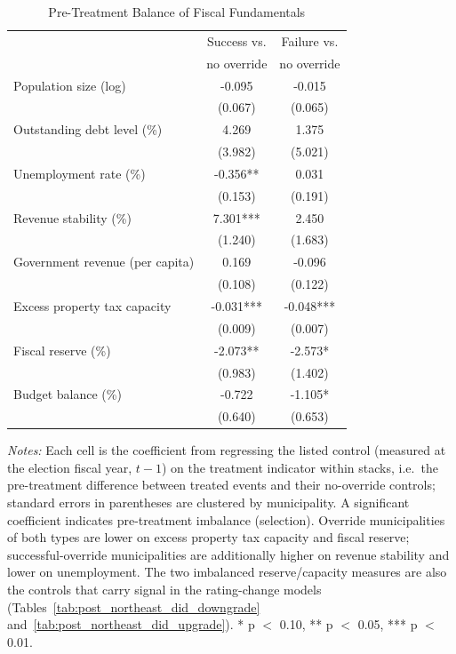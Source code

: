 \begin{table}[!htbp]
\centering
\caption{Pre-Treatment Balance of Fiscal Fundamentals}
\label{tab:post_northeast_did_balance}
\small
\begin{tabular}{lcc}
\toprule
 & Success vs. & Failure vs. \\
 & no override & no override \\
\midrule
Population size (log) & -0.095 & -0.015 \\
 & (0.067) & (0.065) \\
Outstanding debt level (\%) & 4.269 & 1.375 \\
 & (3.982) & (5.021) \\
Unemployment rate (\%) & -0.356** & 0.031 \\
 & (0.153) & (0.191) \\
Revenue stability (\%) & 7.301*** & 2.450 \\
 & (1.240) & (1.683) \\
Government revenue (per capita) & 0.169 & -0.096 \\
 & (0.108) & (0.122) \\
Excess property tax capacity & -0.031*** & -0.048*** \\
 & (0.009) & (0.007) \\
Fiscal reserve (\%) & -2.073** & -2.573* \\
 & (0.983) & (1.402) \\
Budget balance (\%) & -0.722 & -1.105* \\
 & (0.640) & (0.653) \\
\bottomrule
\end{tabular}
\vspace{0.05in}
\begin{minipage}{0.96\textwidth}\footnotesize\emph{Notes:} Each cell is the coefficient from regressing the listed control (measured at the election fiscal year, $t-1$) on the treatment indicator within stacks, i.e.\ the pre-treatment difference between treated events and their no-override controls; standard errors in parentheses are clustered by municipality. A significant coefficient indicates pre-treatment imbalance (selection). Override municipalities of both types are lower on excess property tax capacity and fiscal reserve; successful-override municipalities are additionally higher on revenue stability and lower on unemployment. The two imbalanced reserve/capacity measures are also the controls that carry signal in the rating-change models (Tables~\ref{tab:post_northeast_did_downgrade} and~\ref{tab:post_northeast_did_upgrade}). * p $<$ 0.10, ** p $<$ 0.05, *** p $<$ 0.01.\end{minipage}
\end{table}
